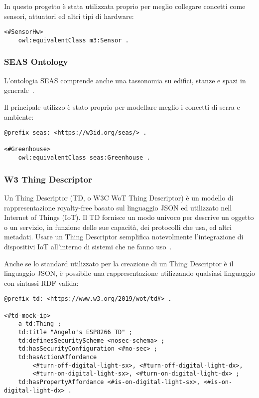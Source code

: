 \noindent In questo progetto è stata utilizzata proprio per meglio collegare concetti come sensori, attuatori ed altri tipi di hardware:

\begin{verbatim}
<#SensorHw>
	owl:equivalentClass m3:Sensor .
\end{verbatim}

\subsubsection{SEAS Ontology}
L'ontologia SEAS comprende anche una tassonomia su edifici, stanze e spazi in generale~\cite{SEAS:online}.

\noindent Il principale utilizzo è stato proprio per modellare meglio i concetti di serra e ambiente:

\begin{verbatim}
@prefix seas: <https://w3id.org/seas/> .

<#Greenhouse>
	owl:equivalentClass seas:Greenhouse .
\end{verbatim}

\subsubsection{W3 Thing Descriptor}
Un Thing Descriptor (TD, o W3C WoT Thing Descriptor) è un modello di rappresentazione royalty-free basato sul linguaggio JSON ed utilizzato nell Internet of Things (IoT). Il TD fornisce un modo univoco per descrive un oggetto o un servizio, in funzione delle sue capacità, dei protocolli che usa, ed altri metadati. Usare un Thing Descriptor semplifica notevolmente l’integrazione di dispositivi IoT all’interno di sistemi che ne fanno uso~\cite{ThingDes54:online}.

\noindent Anche se lo standard utilizzato per la creazione di un Thing Descriptor è il linguaggio JSON, è possibile una rappresentazione utilizzando qualsiasi linguaggio con sintassi RDF valida:
\begin{verbatim}
@prefix td: <https://www.w3.org/2019/wot/td#> .

<#td-mock-ip>
	a td:Thing ;
	td:title "Angelo's ESP8266 TD" ;
	td:definesSecurityScheme <nosec-schema> ;
	td:hasSecurityConfiguration <#no-sec> ;
	td:hasActionAffordance
		<#turn-off-digital-light-sx>, <#turn-off-digital-light-dx>,
		<#turn-on-digital-light-sx>, <#turn-on-digital-light-dx> ;
	td:hasPropertyAffordance <#is-on-digital-light-sx>, <#is-on-digital-light-dx> .
\end{verbatim}
